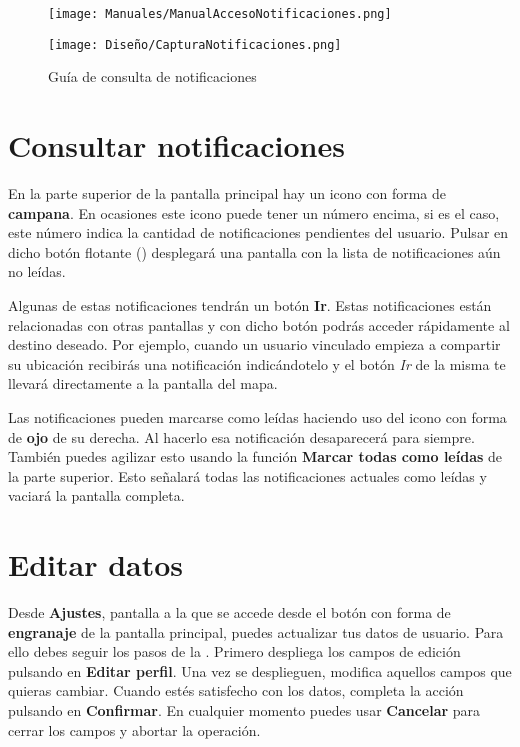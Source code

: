 \begin{figure}[H]
    \centering
    \begin{minipage}{0.5\textwidth}
        \centering
        \texttt{[image: Manuales/ManualAccesoNotificaciones.png]}
    \end{minipage}\hfill
    \begin{minipage}{0.5\textwidth}
        \centering
        \texttt{[image: Diseño/CapturaNotificaciones.png]}
    \end{minipage}\hfill
    \caption{Guía de consulta de notificaciones}
    \label{man:notificaciones}
\end{figure}

\section{Consultar notificaciones}

En la parte superior de la pantalla principal hay un icono con forma de \textbf{campana}. En ocasiones este icono puede tener un número encima, si es el caso, este número indica la cantidad de notificaciones pendientes del usuario. Pulsar en dicho botón flotante () desplegará una pantalla con la lista de notificaciones aún no leídas. 

Algunas de estas notificaciones tendrán un botón \textbf{Ir}. Estas notificaciones están relacionadas con otras pantallas y con dicho botón podrás acceder rápidamente al destino deseado. Por ejemplo, cuando un usuario vinculado empieza a compartir su ubicación recibirás una notificación indicándotelo y el botón \emph{Ir} de la misma te llevará directamente a la pantalla del mapa.

Las notificaciones pueden marcarse como leídas haciendo uso del icono con forma de \textbf{ojo} de su derecha. Al hacerlo esa notificación desaparecerá para siempre. También puedes agilizar esto usando la función \textbf{Marcar todas como leídas} de la parte superior. Esto señalará todas las notificaciones actuales como leídas y vaciará la pantalla completa.

\vspace{-15pt}
\section{Editar datos}

Desde \textbf{Ajustes}, pantalla a la que se accede desde el botón con forma de \textbf{engranaje} de la pantalla principal, puedes actualizar tus datos de usuario. Para ello debes seguir los pasos de la . Primero despliega los campos de edición pulsando en \textbf{Editar perfil}. Una vez se desplieguen, modifica aquellos campos que quieras cambiar. Cuando estés satisfecho con los datos, completa la acción pulsando en \textbf{Confirmar}. En cualquier momento puedes usar \textbf{Cancelar} para cerrar los campos y abortar la operación.

